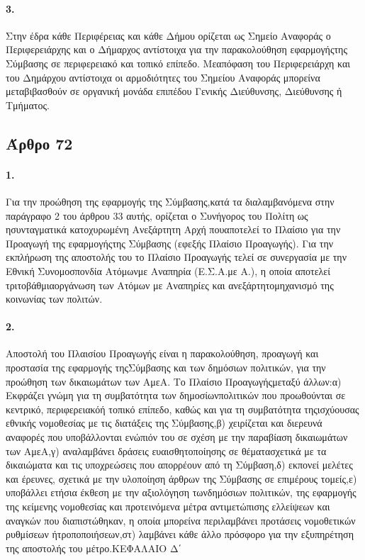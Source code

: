 \documentclass[a4paper,oneside, 10pt]{book}
\begin{document}
\paragraph { 3. } Στην έδρα κάθε Περιφέρειας και κάθε Δήμου ορίζεται ως Σημείο Αναφοράς ο Περιφερειάρχης και ο Δήμαρχος αντίστοιχα για την παρακολούθηση εφαρμογήςτης Σύμβασης σε περιφερειακό και τοπικό επίπεδο. Μεαπόφαση του Περιφερειάρχη και του Δημάρχου αντίστοιχα οι αρμοδιότητες του Σημείου Αναφοράς μπορείνα μεταβιβασθούν σε οργανική μονάδα επιπέδου Γενικής Διεύθυνσης, Διεύθυνσης ή Τμήματος.
\subsection*{ Άρθρο 72 }
\paragraph { 1. } Για την προώθηση της εφαρμογής της Σύμβασης,κατά τα διαλαμβανόμενα στην παράγραφο 2 του άρθρου 33 αυτής, ορίζεται ο Συνήγορος του Πολίτη ως ησυνταγματικά κατοχυρωμένη Ανεξάρτητη Αρχή πουαποτελεί το Πλαίσιο για την Προαγωγή της εφαρμογήςτης Σύμβασης (εφεξής Πλαίσιο Προαγωγής). Για την εκπλήρωση της αποστολής του το Πλαίσιο Προαγωγής τελεί σε συνεργασία με την Εθνική Συνομοσπονδία Ατόμωνμε Αναπηρία (Ε.Σ.Α.με Α.), η οποία αποτελεί τριτοβάθμιαοργάνωση των Ατόμων με Αναπηρίες και ανεξάρτητομηχανισμό της κοινωνίας των πολιτών.
\paragraph { 2. } Αποστολή του Πλαισίου Προαγωγής είναι η παρακολούθηση, προαγωγή και προστασία της εφαρμογής τηςΣύμβασης και των δημόσιων πολιτικών, για την προώθηση των δικαιωμάτων των ΑμεΑ. Το Πλαίσιο Προαγωγήςμεταξύ άλλων:α) Εκφράζει γνώμη για τη συμβατότητα των δημοσίωνπολιτικών που προωθούνται σε κεντρικό, περιφερειακόή τοπικό επίπεδο, καθώς και για τη συμβατότητα τηςισχύουσας εθνικής νομοθεσίας με τις διατάξεις της Σύμβασης,β) χειρίζεται και διερευνά αναφορές που υποβάλλονται ενώπιόν του σε σχέση με την παραβίαση δικαιωμάτων των ΑμεΑ,γ) αναλαμβάνει δράσεις ευαισθητοποίησης σε θέματασχετικά με τα δικαιώματα και τις υποχρεώσεις που απορρέουν από τη Σύμβαση,δ) εκπονεί μελέτες και έρευνες, σχετικά με την υλοποίηση άρθρων της Σύμβασης σε επιμέρους τομείς,ε) υποβάλλει ετήσια έκθεση με την αξιολόγηση τωνδημόσιων πολιτικών, της εφαρμογής της κείμενης νομοθεσίας και προτεινόμενα μέτρα αντιμετώπισης ελλείψεων και αναγκών που διαπιστώθηκαν, η οποία μπορείνα περιλαμβάνει προτάσεις νομοθετικών ρυθμίσεων ήτροποποιήσεων,στ) λαμβάνει κάθε άλλο πρόσφορο για την εξυπηρέτηση της αποστολής του μέτρο.ΚΕΦΑΛΑΙΟ Δ΄
\end{document}
